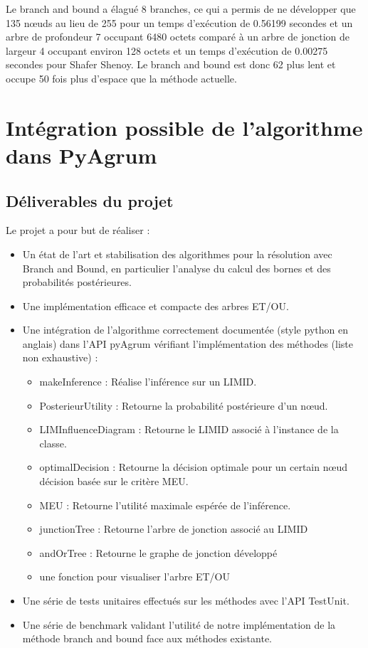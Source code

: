 \documentclass[12pt]{article}
\begin{document}
Le branch and bound a élagué 8 branches, ce qui a permis de ne développer que 135 nœuds au lieu de 255 pour un temps d'exécution de 0.56199 secondes et un arbre de profondeur 7 occupant 6480 octets comparé à un arbre de jonction de largeur 4 occupant environ 128 octets et un temps d'exécution de 0.00275 secondes pour Shafer Shenoy. Le branch and bound est donc 62 plus lent et occupe 50 fois plus d'espace que la méthode actuelle.
\section{Intégration possible de l'algorithme dans PyAgrum}
\subsection{Déliverables du projet}
Le projet a pour but de réaliser :
\begin{itemize}
\item Un état de l'art et stabilisation des algorithmes pour la résolution avec Branch and Bound, en particulier l'analyse du calcul des bornes et des probabilités postérieures.
\item Une implémentation efficace et compacte des arbres ET/OU.

\item Une intégration de l'algorithme correctement documentée (style python en anglais) dans l'API pyAgrum vérifiant l'implémentation des méthodes (liste non exhaustive) :
\begin{itemize}
    \item makeInference : Réalise l'inférence sur un LIMID.
    \item PosterieurUtility : Retourne la probabilité postérieure d'un nœud.
    \item LIMInfluenceDiagram : Retourne le LIMID associé à l'instance de la classe.
    \item optimalDecision : Retourne la décision optimale pour un certain nœud décision basée sur le critère MEU.
    \item MEU : Retourne l'utilité maximale espérée de l'inférence.
    \item junctionTree : Retourne l'arbre de jonction associé au LIMID
    \item andOrTree : Retourne le graphe de jonction développé
    \item une fonction pour visualiser l'arbre ET/OU
\end{itemize}
\item Une série de tests unitaires effectués sur les méthodes avec l'API TestUnit.
\item Une série de benchmark validant l'utilité de notre implémentation de la méthode branch and bound face aux méthodes existante.
\end{itemize}
\end{document}
